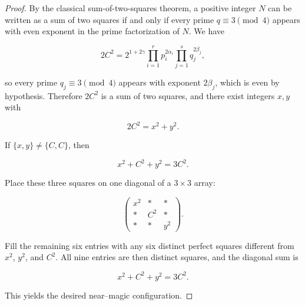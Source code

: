 \documentclass[12pt]{article}
\newtheorem{proof}{Proof}
\begin{document}
\begin{proof}
By the classical sum-of-two-squares theorem, a positive integer $N$ can be written as a sum of two squares if and only if every prime $q \equiv 3 \pmod{4}$ appears with even exponent in the prime factorization of $N$.  
We have


\[
2C^2
= 2^{1+2\gamma}\prod_{i=1}^r p_i^{2\alpha_i}\prod_{j=1}^s q_j^{2\beta_j},
\]


so every prime $q_j \equiv 3 \pmod{4}$ appears with exponent $2\beta_j$, which is even by hypothesis.  
Therefore $2C^2$ is a sum of two squares, and there exist integers $x,y$ with


\[
2C^2 = x^2 + y^2.
\]



If $\{x,y\} \neq \{C,C\}$, then


\[
x^2 + C^2 + y^2 = 3C^2.
\]


Place these three squares on one diagonal of a $3\times 3$ array:


\[
\begin{pmatrix}
x^2 & * & *\\
*   & C^2 & *\\[4pt]
*   & * & y^2
\end{pmatrix}.
\]


Fill the remaining six entries with any six distinct perfect squares different from $x^2$, $y^2$, and $C^2$.  
All nine entries are then distinct squares, and the diagonal sum is


\[
x^2 + C^2 + y^2 = 3C^2.
\]


This yields the desired near--magic configuration.
\end{proof}
\end{document}
